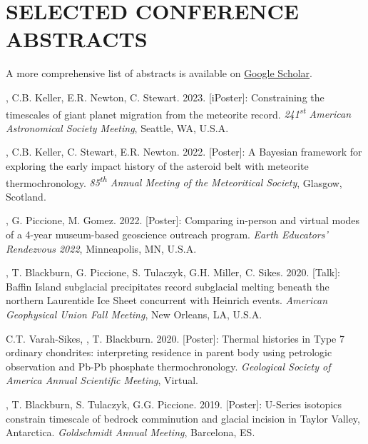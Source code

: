\section*{SELECTED CONFERENCE ABSTRACTS}

\begin{center} 
A more comprehensive list of abstracts is available on \href{https://scholar.google.com/citations?user=KHLOvgcAAAAJ&hl=en}{Google Scholar}. 
\end{center}

\begin{etaremune} [itemsep=4pt, leftmargin=3ex]
  \item \ghedwards, C.B. Keller,  E.R. Newton, C. Stewart. 2023. [iPoster]: Constraining the timescales of giant planet migration from the meteorite record. \textit{241\textsuperscript{st} American Astronomical Society Meeting}, Seattle, WA, U.S.A.
  
  \item \ghedwards, C.B. Keller, C. Stewart, E.R. Newton. 2022. [Poster]: A Bayesian framework for exploring the early impact history of the asteroid belt with meteorite thermochronology. \textit{85\textsuperscript{th} Annual Meeting of the Meteoritical Society}, Glasgow, Scotland. 
 
  \item \ghedwards, G. Piccione, M. Gomez. 2022. [Poster]: Comparing in-person and virtual modes of a 4-year museum-based geoscience outreach program. \textit{Earth Educators' Rendezvous 2022}, Minneapolis, MN, U.S.A.
  
  \item \ghedwards, T. Blackburn, G. Piccione, S. Tulaczyk, G.H. Miller, C. Sikes. 2020. [Talk]: Baffin Island subglacial precipitates record subglacial melting beneath the northern Laurentide Ice Sheet concurrent with Heinrich events. \textit{American Geophysical Union Fall Meeting}, New Orleans, LA, U.S.A.
  
  \item C.T. Varah-Sikes, \ghedwards, T. Blackburn. 2020. [Poster]: Thermal histories in Type 7 ordinary chondrites: interpreting residence in parent body using petrologic observation and Pb-Pb phosphate thermochronology. \textit{Geological Society of America Annual Scientific Meeting}, Virtual.
  
  \item  \ghedwards, T. Blackburn, S. Tulaczyk, G.G. Piccione. 2019. [Poster]: U-Series isotopics constrain timescale of bedrock comminution and glacial incision in Taylor Valley, Antarctica. \textit{Goldschmidt Annual Meeting}, Barcelona, ES.
  

\end{etaremune}
